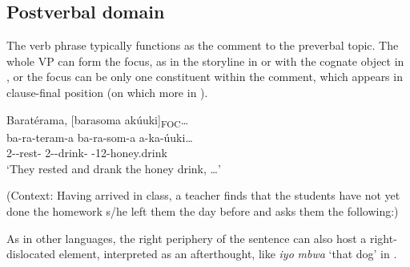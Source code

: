 \documentclass[output=paper]{langscibook}
\begin{document}
\subsection{Postverbal domain}
\label{bkm:Ref72335068}
The verb phrase typically functions as the comment to the preverbal topic. The whole VP can form the focus, as in the storyline in  or with the cognate object in , or the focus can be only one constituent within the comment, which appears in clause-final position (on which more in ). 

\ea
\label{bkm:Ref142555660}
Baratérama, [barasoma akúuki]\textsubscript{FOC}…  \\
\gll
ba-ra-teram-a  ba-ra-som-a  a-ka-úuki… \\
2\SM{}-\DJ{}-rest-\FV{}  2\SM{}-\DJ{}-drink-\FV{}  \AUG{}-12-honey.drink\\
\glt
‘They rested and drank the honey drink, …'\\

\z

\ea
\label{bkm:Ref142555662}
(Context: Having arrived in class, a teacher finds that the students have not yet done the homework s/he left them the day before and asks them the following:)

\begin{xlist}


\end{xlist}
\z

As in other languages, the right periphery of the sentence can also host a right-dislocated element, interpreted as an afterthought, like \textit{iyo} \textit{mbwa} ‘that dog’ in .
\end{document}
